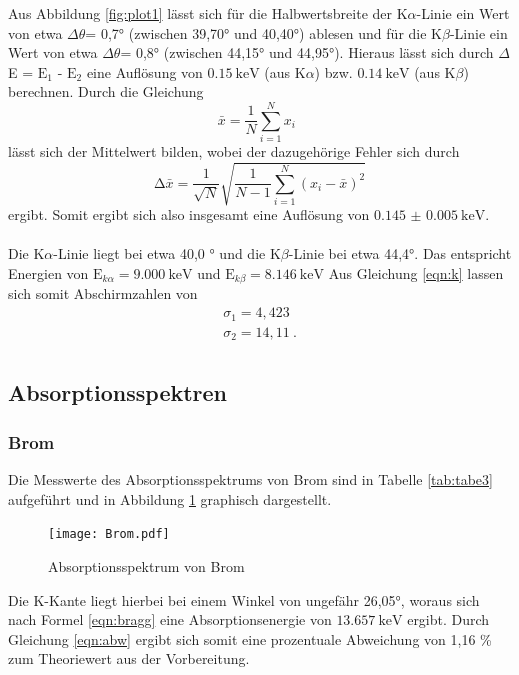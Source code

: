 Aus Abbildung \ref{fig:plot1} lässt sich für die Halbwertsbreite der K$\alpha$-Linie
ein Wert von etwa $\Delta \theta$= 0,7° (zwischen 39,70° und 40,40°) ablesen und für die K$\beta$-Linie ein
Wert von etwa $\Delta \theta$= 0,8° (zwischen 44,15° und 44,95°).
Hieraus lässt sich durch $\Delta$E = $\text{E}_1$ - $\text{E}_2$
eine Auflösung von $\SI{0.15}{\kilo\electronvolt}$ (aus K$\alpha$) bzw. $\SI{0.14}{\kilo\electronvolt}$
(aus K$\beta$) berechnen.
Durch die Gleichung
\begin{equation}
  \bar{x} = \frac{1}{N} \sum_{i=1}^{N} x_i \: \:
  \label{eqn:mit}
\end{equation}
\noindent lässt sich der Mittelwert bilden, wobei der dazugehörige Fehler sich durch
\begin{equation}
  \increment \bar{x} = \frac{1}{\sqrt{N}} \sqrt{ \frac{1}{N-1} \sum_{i=1}^N
  (x_i - \bar{x})^2}
  \label{eqn:mitf}
\end{equation}
ergibt.
Somit ergibt sich also insgesamt eine Auflösung von $\SI{0.145(5)}{\kilo\electronvolt}$.\\
\\



\noindent Die K$\alpha$-Linie liegt bei etwa 40,0 ° und die K$\beta$-Linie bei etwa 44,4°.
Das entspricht Energien von $\text{E}_{k\alpha} = \SI{9.000}{\kilo\electronvolt}$ und
$\text{E}_{k\beta} = \SI{8.146}{\kilo\electronvolt}$
Aus Gleichung \ref{eqn:k} lassen sich somit Abschirmzahlen von
\begin{align*}
  \sigma_1 = 4,423 \\
  \sigma_2 = 14,11 \: . \\
\end{align*}

\subsection{Absorptionsspektren}
\subsubsection{Brom}
Die Messwerte des Absorptionsspektrums von Brom sind in Tabelle \ref{tab:tabe3} aufgeführt und
in Abbildung \ref{fig:brom} graphisch dargestellt.

\begin{figure}[H]
  \centering
  \texttt{[image: Brom.pdf]}
  \caption{Absorptionsspektrum von Brom}
  \label{fig:brom}
\end{figure}
Die K-Kante liegt hierbei bei einem Winkel von ungefähr 26,05°, woraus sich nach Formel
\ref{eqn:bragg} eine Absorptionsenergie von $\SI{13.657}{\kilo\electronvolt}$ ergibt. Durch Gleichung
\ref{eqn:abw} ergibt sich somit eine prozentuale Abweichung von 1,16 \%
zum Theoriewert aus der Vorbereitung.


